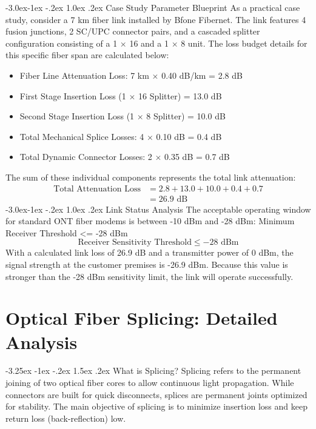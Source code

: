 \documentclass[11pt,a4paper]{report}
\makeatletter
\renewcommand{\section}{\@startsection{section}{1}{\z@}%
  {-3.25ex \@plus -1ex \@minus -.2ex}%
  {1.5ex \@plus.2ex}%
  {\normalfont\Large\bfseries\color{primaryColor}}}
\renewcommand{\subsection}{\@startsection{subsection}{2}{\z@}%
  {-3.0ex\@plus -1ex \@minus -.2ex}%
  {1.0ex \@plus .2ex}%
  {\normalfont\large\bfseries\color{secondaryColor}}}
\makeatother
\begin{document}
\subsection{Case Study Parameter Blueprint}
As a practical case study, consider a 7 km fiber link installed by Bfone Fibernet. The link features 4 fusion junctions, 2 SC/UPC connector pairs, and a cascaded splitter configuration consisting of a 1 $\times$ 16 and a 1 $\times$ 8 unit. The loss budget details for this specific fiber span are calculated below:
\begin{itemize}
  \item Fiber Line Attenuation Loss: 7 km $\times$ 0.40 dB/km = 2.8 dB
  \item First Stage Insertion Loss (1 $\times$ 16 Splitter) = 13.0 dB
  \item Second Stage Insertion Loss (1 $\times$ 8 Splitter) = 10.0 dB
  \item Total Mechanical Splice Losses: 4 $\times$ 0.10 dB = 0.4 dB
  \item Total Dynamic Connector Losses: 2 $\times$ 0.35 dB = 0.7 dB
\end{itemize}
The sum of these individual components represents the total link attenuation:
\begin{align*} \text{Total Attenuation Loss} &= 2.8 + 13.0 + 10.0 + 0.4 + 0.7 \\ &= 26.9\text{ dB} \end{align*}
\subsection{Link Status Analysis}
The acceptable operating window for standard ONT fiber modems is between -10 dBm and -28 dBm: Minimum Receiver Threshold <= -28 dBm
\begin{equation}\text{Receiver Sensitivity Threshold} \le -28\text{ dBm}\end{equation}
With a calculated link loss of 26.9 dB and a transmitter power of 0 dBm, the signal strength at the customer premises is -26.9 dBm. Because this value is stronger than the -28 dBm sensitivity limit, the link will operate successfully.
\chapter{Optical Fiber Splicing: Detailed Analysis}
\section{What is Splicing?}
Splicing refers to the permanent joining of two optical fiber cores to allow continuous light propagation. While connectors are built for quick disconnects, splices are permanent joints optimized for stability. The main objective of splicing is to minimize insertion loss and keep return loss (back-reflection) low.
\end{document}
